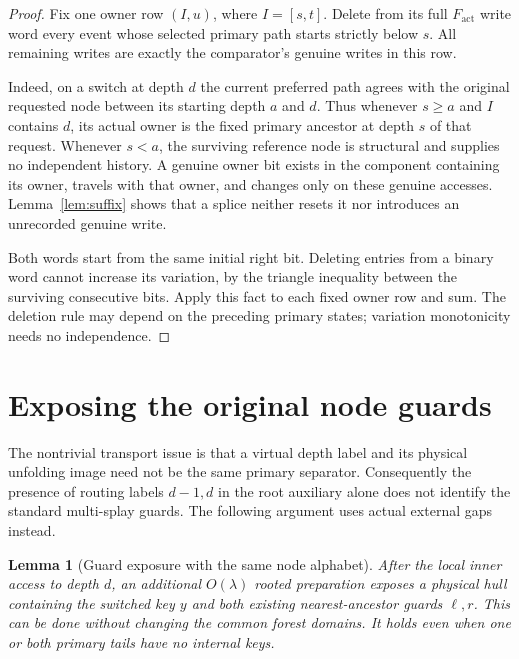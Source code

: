 \documentclass[11pt]{article}
\newtheorem{lemma}[theorem]{Lemma}
\begin{document}
\begin{proof}
Fix one owner row $(I,u)$, where $I=[s,t]$. Delete from its full
$F_{\mathrm{act}}$ write word every event whose selected primary path
starts strictly below $s$. All remaining writes are exactly the
comparator's genuine writes in this row.

Indeed, on a switch at depth $d$ the current preferred path agrees
with the original requested node between its starting depth $a$ and
$d$. Thus whenever $s\ge a$ and $I$ contains $d$, its actual owner is
the fixed primary ancestor at depth $s$ of that request. Whenever
$s<a$, the surviving reference node is structural and supplies no
independent history. A genuine owner bit exists in the component
containing its owner, travels with that owner, and changes only on
these genuine accesses. Lemma~\ref{lem:suffix} shows that a splice
neither resets it nor introduces an unrecorded genuine write.

Both words start from the same initial right bit. Deleting entries
from a binary word cannot increase its variation, by the triangle
inequality between the surviving consecutive bits. Apply this fact
to each fixed owner row and sum. The deletion rule may depend on the
preceding primary states; variation monotonicity needs no independence.
\end{proof}

\section{Exposing the original node guards}

The nontrivial transport issue is that a virtual depth label and its
physical unfolding image need not be the same primary separator.
Consequently the presence of routing labels $d-1,d$ in the root
auxiliary alone does not identify the standard multi-splay guards.
The following argument uses actual external gaps instead.

\begin{lemma}[Guard exposure with the same node alphabet]\label{lem:guards}
After the local inner access to depth $d$, an additional $O(\lambda)$
rooted preparation exposes a physical hull containing the switched
key $y$ and both existing nearest-ancestor guards $\ell,r$. This can
be done without changing the common forest domains. It holds even
when one or both primary tails have no internal keys.
\end{lemma}
\end{document}
